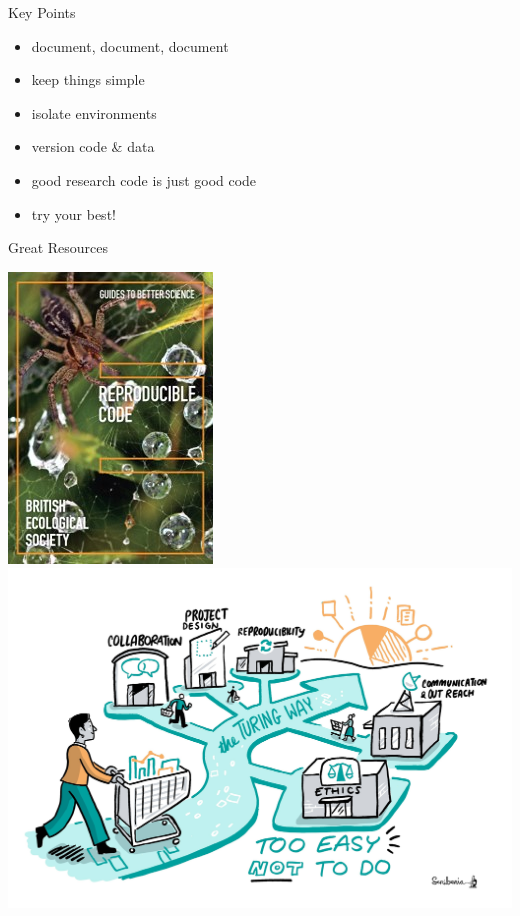\documentclass{beamer} %
\begin{document}
  \begin{frame}{Key Points}
    \begin{itemize}
      \item document, document, document
      \item keep things simple
      \item isolate environments
      \item version code \& data
      \item good research code is just good code
      \item try your best!
    \end{itemize}
  \end{frame}

  \begin{frame}{Great Resources}
    \begin{center}
      \href{https://www.britishecologicalsociety.org/wp-content/uploads/2019/06/BES-Guide-Reproducible-Code-2019.pdf}{\includegraphics[height=0.4\textheight]{bes_reproducible_code.jpg}}
      \hspace{1cm}
      \href{https://the-turing-way.netlify.app/}{\includegraphics[height=0.4\textheight]{turing_way.jpg}}

\end{center}
\end{frame}
\end{document}
